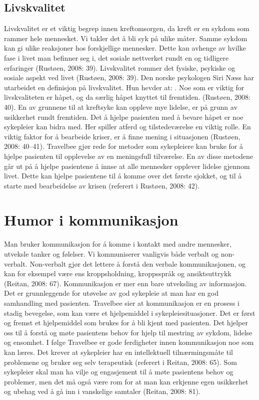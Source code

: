 \subsection{Livskvalitet}

Livskvalitet er et viktig begrep innen kreftomsorgen, da kreft er en sykdom som
rammer hele mennesket. Vi takler det å bli syk på ulike måter. Samme sykdom kan
gi ulike reaksjoner hos forskjellige mennesker. Dette kan avhenge av hvilke
fase i livet man befinner seg i, det sosiale nettverket rundt en og tidligere
erfaringer (Rustøen, 2008: 39).  Livskvalitet rommer det fysiske, psykiske og
sosiale aspekt ved livet (Rustøen, 2008: 39). Den norske psykologen Siri Næss
har utarbeidet en definisjon på livskvalitet. Hun hevder at: .  Noe som er viktig for livskvaliteten er håpet, og da
særlig håpet knyttet til fremtiden. (Rustøen, 2008: 40).  En av grunnene til at
kreftsyke kan oppleve mye lidelse, er på grunn av usikkerhet rundt fremtiden.
Det å hjelpe pasienten med å bevare håpet er noe sykepleier kan bidra med. Her
spiller atferd og tilstedeværelse en viktig rolle. En viktig faktor for å
bearbeide kriser, er å finne mening i situasjonen (Rustøen, 2008: 40--41).
Travelbee gjør rede for metoder som sykepleiere kan bruke for å hjelpe
pasienten til opplevelse av en meningsfull tilværelse. En av disse metodene går
ut på å hjelpe pasientene å innse at alle mennesker opplever lidelse gjennom
livet. Dette kan hjelpe pasientene til å komme over det første sjokket, og til
å starte med bearbeidelse av krisen (referert i Rustøen, 2008: 42).

\section{Humor i kommunikasjon}

Man bruker kommunikasjon for å komme i kontakt med andre mennesker, utveksle
tanker og følelser. Vi kommuniserer vanligvis både verbalt og non-verbalt.
Non-verbalt gjør det lettere å forstå den verbale kommunikasjonen, og kan for
eksempel være ens kroppsholdning, kroppsspråk og ansiktsuttrykk (Reitan, 2008:
67).  Kommunikasjon er mer enn bare utveksling av informasjon. Det er
grunnleggende for utøvelse av god sykepleie at man har en god samhandling med
pasienten. Travelbee sier at kommunikasjon er en prosess i stadig bevegelse,
som kan være et hjelpemiddel i sykepleiesituasjoner. Det er først og fremst et
hjelpemiddel som brukes for å bli kjent med pasienten. Det hjelper oss til å
forstå og møte pasientens behov for hjelp til mestring av sykdom, lidelse og
ensomhet. I følge Travelbee er gode ferdigheter innen kommunikasjon noe som kan
læres. Det krever at sykepleier har en intellektuell tilnærmingsmåte til
problemene og bruker seg selv terapeutisk (referert i Reitan, 2008: 65). Som
sykepleier skal man ha vilje og engasjement til å møte pasientens behov og
problemer, men det må også være rom for at man kan erkjenne egen usikkerhet og
ubehag ved å gå inn i vanskelige samtaler (Reitan, 2008: 81).

